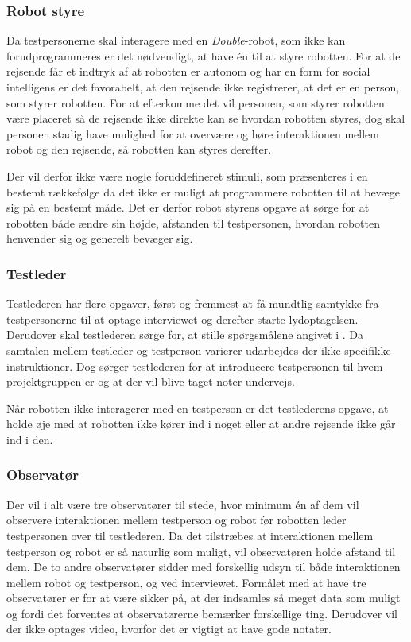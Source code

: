 \subsubsection*{Robot styre}
Da testpersonerne skal interagere med en \textit{Double}-robot, som ikke kan forudprogrammeres er det nødvendigt, at have én til at styre robotten. For at de rejsende får et indtryk af at robotten er autonom og har en form for social intelligens er det favorabelt, at den rejsende ikke registrerer, at det er en person, som styrer robotten. For at efterkomme det vil personen, som styrer robotten være placeret så de rejsende ikke direkte kan se hvordan robotten styres, dog skal personen stadig have mulighed for at overvære og høre interaktionen mellem robot og den rejsende, så robotten kan styres derefter.

Der vil derfor ikke være nogle foruddefineret stimuli, som præsenteres i en bestemt rækkefølge da det ikke er muligt at programmere robotten til at bevæge sig på en bestemt måde. Det er derfor robot styrens opgave at sørge for at robotten både ændre sin højde, afstanden til testpersonen, hvordan robotten henvender sig og generelt bevæger sig.   

\subsubsection*{Testleder}
Testlederen har flere opgaver, først og fremmest at få mundtlig samtykke fra testpersonerne til at optage interviewet og derefter starte lydoptagelsen. Derudover skal testlederen sørge for, at stille spørgsmålene angivet i . Da samtalen mellem testleder og testperson varierer udarbejdes der ikke specifikke instruktioner. Dog sørger testlederen for at introducere testpersonen til hvem projektgruppen er og at der vil blive taget noter undervejs. 

Når robotten ikke interagerer med en testperson er det testlederens opgave, at holde øje med at robotten ikke kører ind i noget eller at andre rejsende ikke går ind i den.    

\subsubsection*{Observatør}
Der vil i alt være tre observatører til stede, hvor minimum én af dem vil observere interaktionen mellem testperson og robot før robotten leder testpersonen over til testlederen. Da det tilstræbes at interaktionen mellem testperson og robot er så naturlig som muligt, vil observatøren holde afstand til dem. De to andre observatører sidder med forskellig udsyn til både interaktionen mellem robot og testperson, og ved interviewet. Formålet med at have tre observatører er for at være sikker på, at der indsamles så meget data som muligt og fordi det forventes at observatørerne bemærker forskellige ting. Derudover vil der ikke optages video, hvorfor det er vigtigt at have gode notater. 

